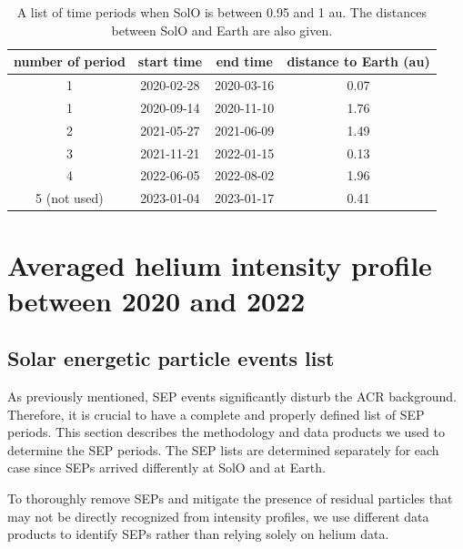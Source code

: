 \begin{table}[!htb]
    \centering
	\caption[Time periods when \ac{SolO} closed to 1 au]{A list of time periods when \ac{SolO} is between 0.95 and 1 au. The distances between \ac{SolO} and Earth are also given.}
	\label{tab:1AU_period}
    \begin{tabular}{|c|c|c|c|}
    \hline
	number of period & start time & end time & distance to Earth  (au)\\
    \hline
    1   & 2020-02-28 & 2020-03-16   & 0.07 \\
    \hline
	1	& 2020-09-14 & 2020-11-10	& 1.76 \\
    \hline
	2	& 2021-05-27 & 2021-06-09	& 1.49 \\
    \hline
	3	& 2021-11-21 & 2022-01-15	& 0.13 \\
    \hline
	4	& 2022-06-05 & 2022-08-02	& 1.96 \\
    \hline
    5 (not used)	& 2023-01-04 & 2023-01-17	& 0.41 \\
    \hline
    \end{tabular}
\end{table}

\section{Averaged helium intensity profile between 2020 and 2022}
\subsection*{Solar energetic particle events list}

As previously mentioned, \ac{SEP} events significantly disturb the \ac{ACR} background. Therefore, it is crucial to have a complete and properly defined list of \ac{SEP} periods. This section describes the methodology and data products we used to determine the \ac{SEP} periods. The \ac{SEP} lists are determined separately for each case since \acp{SEP} arrived differently at \ac{SolO} and at Earth. 

To thoroughly remove \acp{SEP} and mitigate the presence of residual particles that may not be directly recognized from intensity profiles, we use different data products to identify \acp{SEP} rather than relying solely on helium data.

